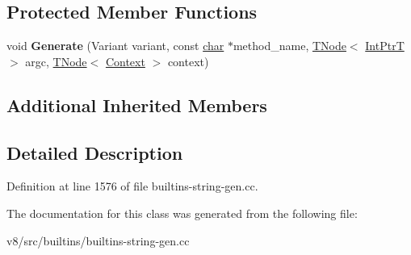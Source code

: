 \subsection*{Protected Member Functions}
\begin{DoxyCompactItemize}
\item 
\mbox{\label{classv8_1_1internal_1_1StringPadAssembler_a70d36dd1d2f8b5abc4ed44a46d0f2166}} 
void {\bfseries Generate} (Variant variant, const \mbox{\hyperlink{classchar}{char}} $\ast$method\+\_\+name, \mbox{\hyperlink{classv8_1_1internal_1_1compiler_1_1TNode}{T\+Node}}$<$ \mbox{\hyperlink{structv8_1_1internal_1_1IntPtrT}{Int\+PtrT}} $>$ argc, \mbox{\hyperlink{classv8_1_1internal_1_1compiler_1_1TNode}{T\+Node}}$<$ \mbox{\hyperlink{classv8_1_1internal_1_1Context}{Context}} $>$ context)
\end{DoxyCompactItemize}
\subsection*{Additional Inherited Members}


\subsection{Detailed Description}


Definition at line 1576 of file builtins-\/string-\/gen.\+cc.



The documentation for this class was generated from the following file\+:\begin{DoxyCompactItemize}
\item 
v8/src/builtins/builtins-\/string-\/gen.\+cc\end{DoxyCompactItemize}
